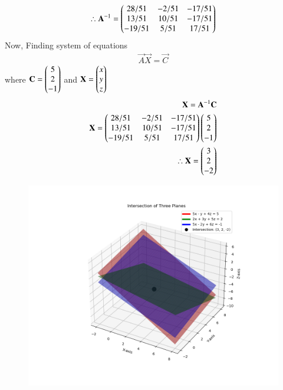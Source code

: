 \documentclass[journal]{IEEEtran}
\begin{document}
    \begin{align}
        \therefore \mathbf{A}^{-1} = \begin{pmatrix} 28/51 & -2/51 & -17/51 \\ 13/51 & 10/51 & -17/51 \\ -19/51 & 5/51 & 17/51 \end{pmatrix}
    \end{align}
Now, Finding system of equations
\begin{align}
    \vec{A}\vec{X}=\vec{C}
\end{align}
where $\mathbf{C}=\begin{pmatrix}5\\2\\-1\end{pmatrix}$ and $\mathbf{X}=\begin{pmatrix}x\\y\\z\end{pmatrix}$
\begin{align}
    \mathbf{X}=\mathbf{A}^{-1}\mathbf{C}\\
    \mathbf{X}=\begin{pmatrix} 28/51 & -2/51 & -17/51 \\ 13/51 & 10/51 & -17/51 \\ -19/51 & 5/51 & 17/51 \end{pmatrix}\begin{pmatrix}5\\2\\-1\end{pmatrix}\\
    \therefore \mathbf{X}=\begin{pmatrix}3\\2\\-2\end{pmatrix}
\end{align}
\newpage
\begin{figure}
    \centering
    \includegraphics[width=1.2\columnwidth]{figs/Figure_1.png}
    \label{fig:placeholder}
    \caption{}
\end{figure}
\end{document}
